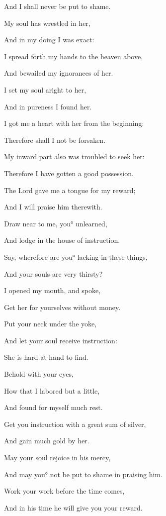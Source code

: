 {\par }{\Q And I shall never be put to shame.
\par }{\Q {}My soul has wrestled in her,
\par }{\Q And in my doing I was exact:
\par }{\Q I spread forth my hands to the heaven above,
\par }{\Q And bewailed my ignorances of her.
\par }{\Q {}I set my soul aright to her,
\par }{\Q And in pureness I found her.
\par }{\Q I got me a heart
{} with her from the beginning:
\par }{\Q Therefore shall I not be forsaken.
\par }{\Q {}My inward part also was troubled to seek her:
\par }{\Q Therefore I have gotten a good possession.
\par }{\Q {}The Lord gave me a tongue for my reward;
\par }{\Q And I will praise him therewith.
\par }{\BB \par }{\Q {}Draw near to me, you° unlearned,
\par }{\Q And lodge in the house of instruction.
\par }{\Q {}Say, wherefore are you° lacking in these things,
\par }{\Q And your souls are very thirsty?
\par }{\Q {}I opened my mouth, and spoke,
\par }{\Q Get her for yourselves without money.
\par }{\Q {}Put your neck under the yoke,
\par }{\Q And let your soul receive instruction:
\par }{\Q She is hard at hand to find.
\par }{\Q {}Behold with your eyes,
\par }{\Q How that I labored but a little,
\par }{\Q And found for myself much rest.
\par }{\Q {}Get you instruction with a great sum of silver,
\par }{\Q And gain much gold by her.
\par }{\Q {}May your soul rejoice in his mercy,
\par }{\Q And may you° not be put to shame in praising him.
\par }{\Q {}Work your work before the time comes,
\par }{\Q And in his time he will give you your reward.
\par }